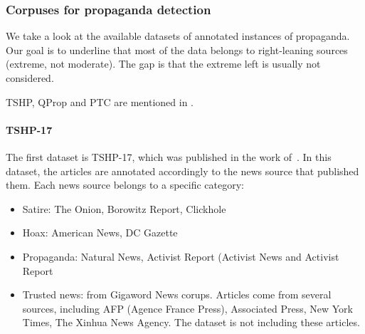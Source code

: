
\subsubsection{Corpuses for propaganda detection}

We take a look at the available datasets of annotated instances of propaganda.
Our goal is to underline that most of the data belongs to right-leaning sources (extreme, not moderate).
The gap is that the extreme left is usually not considered.

TSHP, QProp and PTC are mentioned in \cite{da2020survey}.


\paragraph{TSHP-17}

The first dataset is TSHP-17, which was published in the work of~\citet{rashkin2017truth}. In this dataset, the articles are annotated accordingly to the news source that published them. Each news source belongs to a specific category:
\begin{itemize}
    \item Satire: The Onion, Borowitz Report, Clickhole
    \item Hoax: American News, DC Gazette
    \item Propaganda: Natural News, Activist Report (Activist News and Activist Report
    \item Trusted news: from Gigaword News corups. Articles come from several sources, including AFP (Agence France Press), Associated Press, New York Times, The Xinhua News Agency. The dataset is not including these articles.
\end{itemize}

